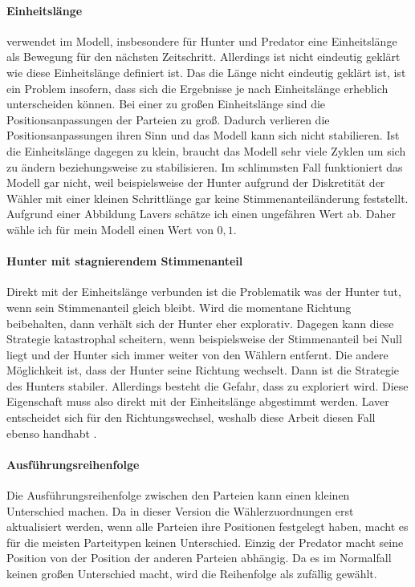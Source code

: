 \paragraph{Einheitslänge}
\citet{laver2005policy} verwendet im Modell, insbesondere für Hunter und Predator eine Einheitslänge als Bewegung für den nächsten Zeitschritt. Allerdings ist nicht eindeutig geklärt wie diese Einheitslänge definiert ist.
Das die Länge nicht eindeutig geklärt ist, ist ein Problem insofern, dass sich die Ergebnisse je nach Einheitslänge erheblich unterscheiden können. Bei einer zu großen Einheitslänge sind die Positionsanpassungen der Parteien zu groß. Dadurch verlieren die Positionsanpassungen ihren Sinn und das Modell kann sich nicht stabilieren. Ist die Einheitslänge dagegen zu klein, braucht das Modell sehr viele Zyklen um sich zu ändern beziehungsweise zu stabilisieren. Im schlimmsten Fall funktioniert das Modell gar nicht, weil beispielsweise der Hunter aufgrund der Diskretität der Wähler mit einer kleinen Schrittlänge gar keine Stimmenanteiländerung feststellt.
Aufgrund einer Abbildung Lavers \citep[Abb.\,4]{laver2005policy} schätze ich einen ungefähren Wert ab. Daher wähle ich für mein Modell einen Wert von $0,1$.

\paragraph{Hunter mit stagnierendem Stimmenanteil}
Direkt mit der Einheitslänge verbunden ist die Problematik was der Hunter tut, wenn sein Stimmenanteil gleich bleibt. Wird die momentane Richtung beibehalten, dann verhält sich der Hunter eher explorativ. Dagegen kann diese Strategie katastrophal scheitern, wenn beispielsweise der Stimmenanteil bei Null liegt und der Hunter sich immer weiter von den Wählern entfernt. Die andere Möglichkeit ist, dass der Hunter seine Richtung wechselt. Dann ist die Strategie des Hunters stabiler. Allerdings besteht die Gefahr, dass zu exploriert wird. Diese Eigenschaft muss also direkt mit der Einheitslänge abgestimmt werden.
Laver entscheidet sich für den Richtungswechsel, weshalb diese Arbeit diesen Fall ebenso handhabt \citep[S.\,280]{laver2005policy}.

\paragraph{Ausführungsreihenfolge}
Die Ausführungsreihenfolge zwischen den Parteien kann einen kleinen Unterschied machen. Da in dieser Version die Wählerzuordnungen erst aktualisiert werden, wenn alle Parteien ihre Positionen festgelegt haben, macht es für die meisten Parteitypen keinen Unterschied. Einzig der Predator macht seine Position von der Position der anderen Parteien abhängig. Da es im Normalfall keinen großen Unterschied macht, wird die Reihenfolge als zufällig gewählt.

